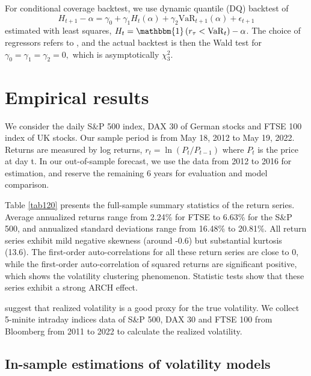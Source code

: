 \documentclass[preprint,12pt,authoryear]{elsarticle}
\begin{document}
For conditional coverage backtest, we use dynamic quantile (DQ) backtest of \cite{Engle2004}
$$H_{t+1}-\alpha=\gamma_0+\gamma_1H_t(\alpha)+\gamma_2 \mathrm{VaR}_{t+1}(\alpha)+\epsilon_{t+1}$$
estimated with least squares, $H_t=\mathbbm{1}\left(r_{\tau}<\mathrm{VaR}_{t}\right)-\alpha$. The choice of regressors refers to \cite{Berkowitz2011}, and the actual backtest is then the Wald test for $\gamma_0=\gamma_1=\gamma_2=0,$ which is asymptotically $\chi^2_3$.

\section{Empirical results}

We consider the daily S\&P 500 index, DAX 30 of German stocks and FTSE 100 index of UK stocks. Our sample period is from May 18, 2012 to May 19, 2022.
Returns are measured by log returns, $r_t=\ln(P_t/P_{t-1})$ where $P_t$ is the price at day t.
In our out-of-sample forecast, we use the data from 2012 to 2016 for estimation, and reserve the remaining 6 years for evaluation and model comparison.

Table \ref{tab120} presents the full-sample summary statistics of the return series.
Average annualized returns range from 2.24\% for FTSE to 6.63\% for the S\&P 500, and annualized standard deviations range from 16.48\% to 20.81\%. All return series exhibit mild negative skewness (around -0.6) but substantial kurtosis (13.6).
The first-order auto-correlations for all these return series are close to 0, while the first-order auto-correlation of squared returns are significant positive, which shows the volatility clustering phenomenon. Statistic tests show that these series exhibit a strong ARCH effect.

\cite{Andersen2006} suggest that realized volatility is a good proxy for the true volatility. We collect 5-minite intraday indices data of S\&P 500, DAX 30 and FTSE 100 from Bloomberg from 2011 to 2022 to calculate the realized volatility.

\subsection{In-sample estimations of volatility models}
\end{document}
